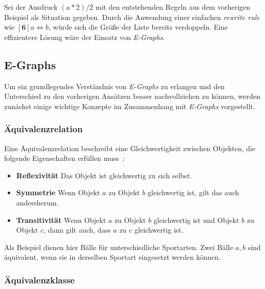 Sei der Ausdruck $(a * 2) / 2$ mit den entstehenden Regeln aus dem vorherigen Beispiel als Situation gegeben. Durch die Anwendung einer einfachen \textit{rewrite rule} wie 
$[\mathbf{6}] a \Leftrightarrow b$, würde sich die Größe der Liste bereits verdoppeln.
Eine effizientere Lösung wäre der Einsatz von \textit{E-Graphs}.


\subsection{E-Graphs}\label{subsec:egraphs}

Um ein grundlegendes Verständnis von \textit{E-Graphs} zu erlangen und den Unterschied zu den vorherigen Ansätzen besser nachvollziehen zu können,
werden zunächst einige wichtige Konzepte im Zusammenhang mit \textit{E-Graphs} vorgestellt. 

\subsubsection{Äquivalenzrelation}

Eine Äquivalenzrelation beschreibt eine Gleichwertigkeit zwischen Objekten, die folgende Eigenschaften erfüllen muss~\cite{Ehrig2001}:

\begin{itemize}
  \item \textbf{Reflexivität} Das Objekt ist gleichwertig zu sich selbst.
  \item \textbf{Symmetrie} Wenn Objekt $a$ zu Objekt $b$ gleichwertig ist, gilt das auch andersherum.
  \item \textbf{Transitivität} Wenn Objekt $a$ zu Objekt $b$ gleichwertig ist und Objekt $b$ zu Objekt $c$, dann gilt auch, dass $a$ zu $c$ gleichwertig ist.
\end{itemize}

Als Beispiel dienen hier Bälle für unterschiedliche Sportarten. Zwei Bälle $a, b$ sind äquivalent, wenn sie in derselben Sportart eingesetzt werden können. 

\subsubsection{Äquivalenzklasse}


